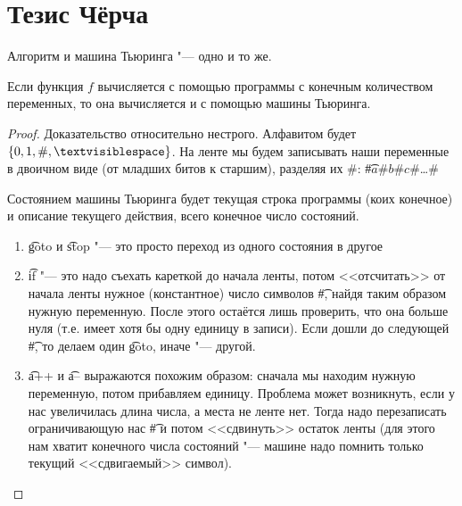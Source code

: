 \section{Тезис Чёрча}

Алгоритм и машина Тьюринга "--- одно и то же.

\begin{theorem}
	Если функция $f$ вычисляется с помощью программы с конечным количеством переменных, то она вычисляется и с помощью машины Тьюринга.
\end{theorem}
\begin{proof}
	Доказательство относительно нестрого.
	Алфавитом будет $\{0, 1, \#, \textvisiblespace\}$.
	На ленте мы будем записывать наши переменные в двоичном виде (от младших битов к старшим), разделяя их $\#$:
	\t{\#$a$\#$b$\#$c$\#\dots\#}

	Состоянием машины Тьюринга будет текущая строка программы (коих конечное) и описание текущего действия, всего конечное число состояний.
	\begin{enumerate}
		\item \t{goto} и \t{stop} "--- это просто переход из одного состояния в другое
		\item
			\t{if} "--- это надо съехать кареткой до начала ленты, потом <<отсчитать>> от начала ленты нужное (константное) число символов \t{\#}, найдя таким образом нужную переменную.
			После этого остаётся лишь проверить, что она больше нуля (т.е. имеет хотя бы одну единицу в записи).
			Если дошли до следующей \t{\#}, то делаем один \t{goto}, иначе "--- другой.
		\item
			\t{a++} и \t{a--} выражаются похожим образом: сначала мы находим нужную переменную, потом прибавляем единицу.
			Проблема может возникнуть, если у нас увеличилась длина числа, а места не ленте нет.
			Тогда надо перезаписать ограничивающую нас \t{\#} и потом <<сдвинуть>> остаток ленты (для этого нам хватит конечного числа состояний "--- машине надо помнить только текущий <<сдвигаемый>> символ).
	\end{enumerate}
\end{proof}

